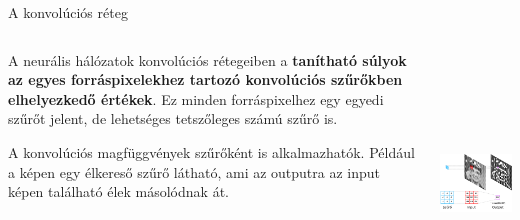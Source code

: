 \documentclass[english, aspectratio=169]{beamer}
\begin{document}
\begin{frame}{A konvolúciós réteg}
	\begin{columns}
		\begin{column}{.5\textwidth}
			A neurális hálózatok konvolúciós rétegeiben a \textbf{tanítható súlyok az egyes forráspixelekhez tartozó konvolúciós szűrőkben elhelyezkedő értékek}. Ez minden forráspixelhez egy egyedi szűrőt jelent, de lehetséges tetszőleges számú szűrő is.\par\smallskip
			A konvolúciós magfüggvények szűrőként is alkalmazhatók. Például a képen egy élkereső szűrő látható, ami az outputra az input képen található élek másolódnak át.\par\smallskip  
		\end{column}
		\begin{column}{.5\textwidth}
			\begin{center}
				\includegraphics[height=7cm, width=7cm, keepaspectratio]{images/dl_4.png}
			\end{center}
		\end{column}
	\end{columns}
\end{frame}
\end{document}
